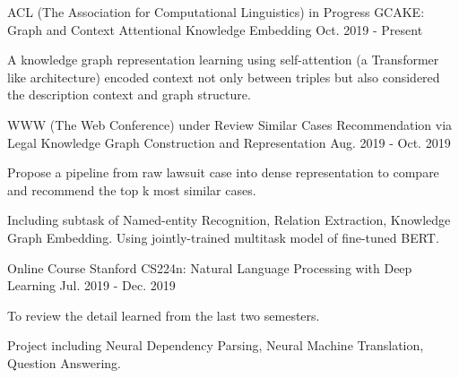

\begin{cventries}

  \cventry
    {ACL (The Association for Computational Linguistics) in Progress} %
    {GCAKE: Graph and Context Attentional Knowledge Embedding} %
    {} %
    {Oct. 2019 - Present} %
    {
      \begin{cvitems} %
        \item {A knowledge graph representation learning using self-attention (a Transformer like architecture) encoded context not only between triples but also considered the description context and graph structure.}
      \end{cvitems}
    }

  \cventry
    {WWW (The Web Conference) under Review} %
    {Similar Cases Recommendation via Legal Knowledge Graph Construction and Representation} %
    {} %
    {Aug. 2019 - Oct. 2019} %
    {
      \begin{cvitems} %
        \item {Propose a pipeline from raw lawsuit case into dense representation to compare and recommend the top k most similar cases.}
        \item {Including subtask of Named-entity Recognition, Relation Extraction, Knowledge Graph Embedding. Using jointly-trained multitask model of fine-tuned BERT.}
      \end{cvitems}
    }

  \cventry
    {Online Course} %
    {Stanford CS224n: Natural Language Processing with Deep Learning} %
    {} %
    {Jul. 2019 - Dec. 2019} %
    {
      \begin{cvitems} %
        \item {To review the detail learned from the last two semesters.}
        \item {Project including Neural Dependency Parsing, Neural Machine Translation, Question Answering.}
      \end{cvitems}
    }


\end{cventries}
